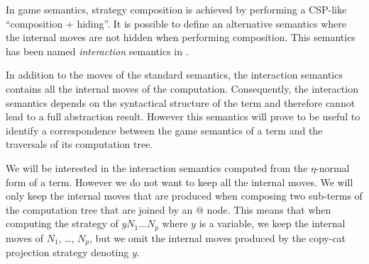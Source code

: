 In game semantics, strategy composition is achieved by performing a CSP-like ``composition + hiding''.
It is possible to define an alternative semantics where the internal moves are not hidden when performing composition.
This semantics has been named \emph{interaction} semantics in \cite{DBLP:conf/sas/DimovskiGL05}.

In addition to the moves of the standard semantics, the interaction semantics contains all
the internal moves of the computation.
Consequently, the interaction semantics depends on the syntactical structure of the term and therefore cannot
lead to a full abstraction result. However this semantics will prove to be useful to identify
a correspondence between the game semantics
of a term and the traversals of its computation tree.

We will be interested in the interaction semantics computed from the
$\eta$-normal form of a term. However we do not want to keep all the internal moves. We will only keep the internal
moves that are produced when composing two sub-terms of the computation tree that are joined by an $@$ node.
This means that when computing the strategy of
$y N_1 \ldots N_p$ where $y$ is a variable, we keep the internal moves of $N_1$, \ldots, $N_p$, but
we omit the internal moves produced by the copy-cat projection strategy denoting $y$.

